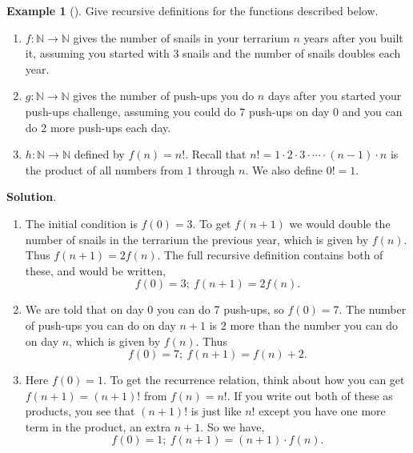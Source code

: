 \documentclass[10pt,]{book}
\theoremstyle{plain}
\theoremstyle{definition}
\theoremstyle{definition}
\newtheorem{example}[theorem]{Example}
\theoremstyle{definition}
\theoremstyle{definition}
\numberwithin{equation}{chapter}
\def\N{\mathbb N}
\begin{document}
\begin{example}[]\label{example-49}
\hypertarget{p-1622}{}%
Give recursive definitions for the functions described below. \leavevmode%
\begin{enumerate}
\item\hypertarget{li-531}{}\hypertarget{p-1623}{}%
\(f:\N \to \N\) gives the number of snails in your terrarium \(n\) years after you built it, assuming you started with 3 snails and the number of snails doubles each year.%
\item\hypertarget{li-532}{}\hypertarget{p-1624}{}%
\(g:\N \to \N\) gives the number of push-ups you do \(n\) days after you started your push-ups challenge, assuming you could do 7 push-ups on day 0 and you can do 2 more push-ups each day.%
\item\hypertarget{li-533}{}\hypertarget{p-1625}{}%
\(h:\N \to \N\) defined by \(f(n) = n!\).  Recall that \(n! = 1 \cdot 2 \cdot 3 \cdot \cdots \cdot (n-1)\cdot n\) is the product of all numbers from \(1\) through \(n\).  We also define \(0! = 1\).%
\end{enumerate}
%
\par\smallskip%
\noindent\textbf{Solution}.\hypertarget{solution-142}{}\quad%
\hypertarget{p-1626}{}%
\leavevmode%
\begin{enumerate}
\item\hypertarget{li-534}{}\hypertarget{p-1627}{}%
The initial condition is \(f(0) = 3\).  To get \(f(n+1)\) we would double the number of snails in the terrarium the previous year, which is given by \(f(n)\).  Thus \(f(n+1) = 2f(n)\).  The full recursive definition contains both of these, and would be written,%
\begin{equation*}
f(0) = 3;~ f(n+1) = 2f(n).
\end{equation*}
%
\item\hypertarget{li-535}{}\hypertarget{p-1628}{}%
We are told that on day 0 you can do 7 push-ups, so \(f(0) = 7\).  The number of push-ups you can do on day \(n+1\) is 2 more than the number you can do on day \(n\), which is given by \(f(n)\).  Thus%
\begin{equation*}
f(0) = 7;~ f(n+1) = f(n) + 2.
\end{equation*}
%
\item\hypertarget{li-536}{}\hypertarget{p-1629}{}%
Here \(f(0) = 1\).  To get the recurrence relation, think about how you can get \(f(n+1) = (n+1)!\) from \(f(n) = n!\).  If you write out both of these as products, you see that \((n+1)!\) is just like \(n!\) except you have one more term in the product, an extra \(n+1\).  So we have,%
\begin{equation*}
f(0) = 1;~ f(n+1) = (n+1)\cdot f(n).
\end{equation*}
%
\end{enumerate}
%
\end{example}
\typeout{************************************************}
\typeout{************************************************}
\end{document}
